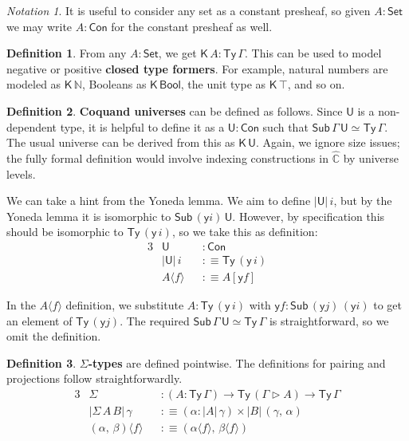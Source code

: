 \documentclass[12pt,a4paper,twoside,openany]{book}
\theoremstyle{remark}
\newtheorem{notation}{Notation}
\theoremstyle{definition}
\newtheorem{mydefinition}{Definition}
\newcommand{\ms}[1]{\mathsf{#1}}
\newcommand{\mbb}[1]{\mathbb{#1}}
\newcommand{\Con}{\mathsf{Con}}
\newcommand{\Sub}{\mathsf{Sub}}
\newcommand{\Ty}{\mathsf{Ty}}
\newcommand{\U}{\mathsf{U}}
\newcommand{\Set}{\mathsf{Set}}
\newcommand{\ext}{\triangleright}
\newcommand{\K}{\mathsf{K}}
\newcommand{\Bool}{\ms{Bool}}
\newcommand{\hmbbC}{\hat{\mbb{C}}}
\newcommand{\lab}{\langle}
\newcommand{\rab}{\rangle}
\newcommand{\defn}{:\equiv}
\newcommand{\yon}{\ms{y}}
\begin{document}
\begin{notation}
It is useful to consider any set as a constant presheaf, so
given $A : \Set$ we may write $A : \Con$ for the constant presheaf
as well.
\end{notation}

\begin{mydefinition}
From any $A : \Set$, we get $\K\,A : \Ty\,\Gamma$. This can be used to
model negative or positive \textbf{closed type formers}. For example, natural
numbers are modeled as $\K\,\mbb{N}$, Booleans as $\K\,\Bool$, the unit type as
$\K\,\top$, and so on.
\end{mydefinition}

\begin{mydefinition}
\textbf{Coquand universes} can be defined as follows. Since $\U$ is a
non-dependent type, it is helpful to define it as a $\U : \Con$ such that
$\Sub\,\Gamma\,\U \simeq \Ty\,\Gamma$.  The usual universe can be derived from
this as $\K\,\U$. Again, we ignore size issues; the fully formal definition
would involve indexing constructions in $\hmbbC$ by universe levels.

We can take a hint from the Yoneda lemma. We aim to define $|\U|\,i$, but by the
Yoneda lemma it is isomorphic to $\Sub\,(\yon i)\,\U$. However, by specification
this should be isomorphic to $\Ty\,(\yon\,i)$, so we take this as definition:
\begin{alignat*}{3}
  & \U &&: \Con\\
  &|\U|\,i &&\defn \Ty\,(\yon\,i)\\
  &A \lab f \rab &&\defn A[\yon f]
\end{alignat*}
\end{mydefinition}
In the $A \lab f \rab$ definition, we substitute $A : \Ty\,(\yon\,i)$ with
$\yon f : \Sub\,(\yon j)\,(\yon i)$ to get an element of $\Ty\,(\yon j)$.
The required $\Sub\,\Gamma\,\U \simeq \Ty\,\Gamma$ is straightforward, so we
omit the definition.

\begin{mydefinition}
\textbf{$\Sigma$-types} are defined pointwise. The definitions for pairing and
projections follow straightforwardly.
\begin{alignat*}{3}
  & \Sigma  &&: (A : \Ty\,\Gamma) \to \Ty\,(\Gamma\ext A) \to \Ty\,\Gamma\\    & |\Sigma\,A\,B|\,\gamma && \defn (\alpha : |A|\,\gamma) \times |B|\,(\gamma,\,\alpha)\\
  & (\alpha,\,\beta) \lab f \rab && \defn (\alpha \lab f \rab,\, \beta \lab f \rab)
\end{alignat*}
\end{mydefinition}
\end{document}
